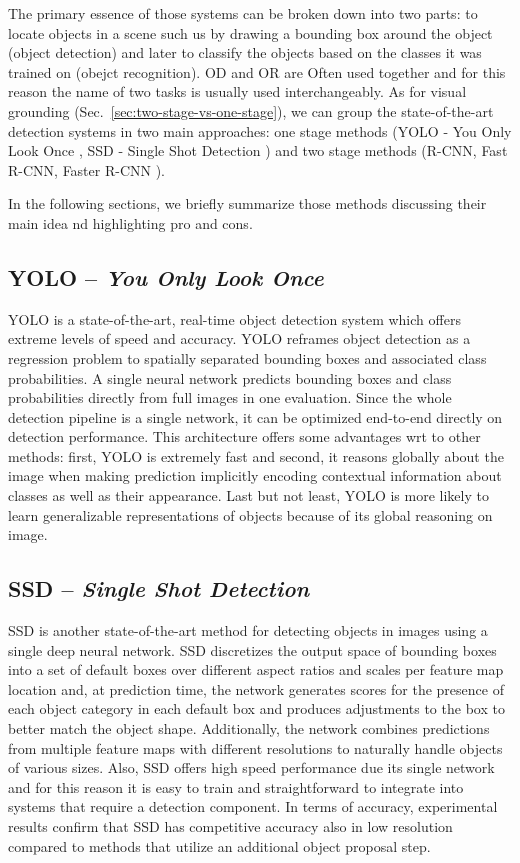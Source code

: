 The primary essence of those systems can be broken down into two
parts: to locate objects in a scene such us by drawing a bounding box
around the object (object detection) and later to classify the objects
based on the classes it was trained on (obejct recognition). OD and OR
are Often used together and for this reason the name of two tasks is
usually used interchangeably. As for visual grounding
(Sec.~\ref{sec:two-stage-vs-one-stage}), we can group the
state-of-the-art detection systems in two main approaches: one stage
methods (YOLO - You Only Look Once , SSD - Single
Shot Detection ) and two stage methods (R-CNN, Fast
R-CNN, Faster R-CNN ). 

In the following sections, we briefly summarize those methods
discussing their main idea nd highlighting pro and cons.

\subsection{YOLO -- \emph{You Only Look Once}}
\label{subsec:yolo}

YOLO is a state-of-the-art, real-time object detection system which
offers extreme levels of speed and accuracy. YOLO reframes object
detection as a regression problem to spatially separated bounding
boxes and associated class probabilities. A single neural network
predicts bounding boxes and class probabilities directly from full
images in one evaluation. Since the whole detection pipeline is a
single network, it can be optimized end-to-end directly on detection
performance. This architecture offers some advantages wrt to other
methods: first, YOLO is extremely fast and second, it reasons globally
about the image when making prediction implicitly encoding contextual
information about classes as well as their appearance. Last but not
least, YOLO is more likely to learn generalizable representations of
objects because of its global reasoning on image.

\subsection{SSD -- \emph{Single Shot Detection}}

SSD is another state-of-the-art method for detecting objects in images
using a single deep neural network. SSD discretizes the output space
of bounding boxes into a set of default boxes over different aspect
ratios and scales per feature map location and, at prediction time,
the network generates scores for the presence of each object category
in each default box and produces adjustments to the box to better
match the object shape. Additionally, the network combines predictions
from multiple feature maps with diﬀerent resolutions to naturally
handle objects of various sizes. Also, SSD offers high speed
performance due its single network and for this reason it is easy to
train and straightforward to integrate into systems that require a
detection component. In terms of accuracy, experimental results conﬁrm
that SSD has competitive accuracy also in low resolution compared to
methods that utilize an additional object proposal step.

